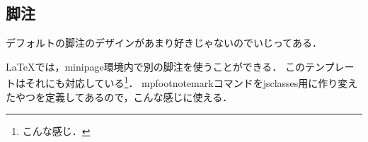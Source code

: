 \subsection{脚注}

デフォルトの脚注のデザインがあまり好きじゃないのでいじってある．

\begin{center}
    \begin{minipage}{0.6\linewidth}
        \LaTeX{}では，minipage環境内で別の脚注を使うことができる．
        このテンプレートはそれにも対応している\footnote{こんな感じ．}．
        mpfootnotemarkコマンドをjsclasses用に作り変えたやつを定義してあるので，こんな感じに使える\mpfootnotemark[765]．
    \end{minipage}
\end{center}

